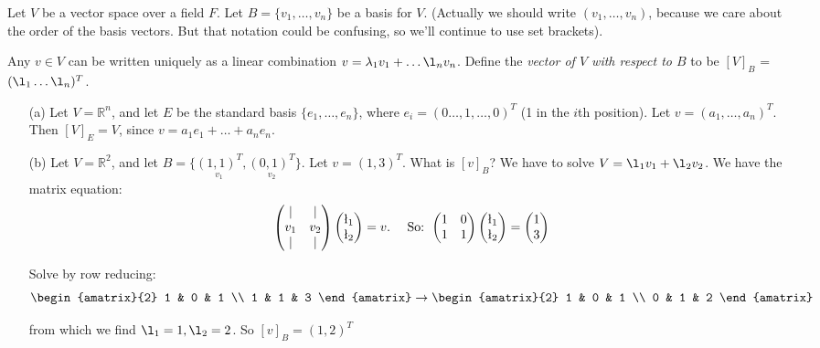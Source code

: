 \documentclass[twoside]{scrartcl}
\begin{document}
\vspace*{5pt}

\begin{definition} 
 Let $V$ be a vector space over a field $F.$ Let $B = \{v_1,\dots,v_n\}$ be a basis for $V$. (Actually we should write $(v_1,\dots,v_n)$, because we care about the order of the basis vectors. But that notation could be confusing, so we'll continue to use set brackets).
 
 Any $v \in V$ can be written uniquely as a linear combination $v = \lambda_1v_1 + \dots \l_nv_n$. Define the \emph{vector of $V$ with respect to $B$} to be $[V]_B$ = $(\l_1 \dots \l_n)^T$.
 \end{definition}\vspace*{10pt}


\begin{examples} \begin{itemize}
 \item[(a)] Let $V = \mathbb{R}^n$, and let $E$ be the standard basis $\{e_1,\dots,e_n\}$, where $e_i = (0\dots,1,\dots,0)^T$ (1 in the $i$th position). Let $v = (a_1, \dots ,a_n)^T.$ Then $[V]_E = V$, since $v = a_1e_1 + \dots + a_ne_n$.
 \item[(b)] Let $V = \mathbb{R}^2$, and let $B = \{\underset{v_1}{(1,1)^T},\underset{v_2}{(0,1)^T}\}$. Let $v = (1,3)^T$. What is $[v]_B$? We have to solve $V = \l_1v_1 + \l_2v_2$. We have the matrix equation:
 \[\begin{pmatrix}
| &  | \\ v_1 & v_2 \\ | & |
\end{pmatrix} 
\begin{pmatrix}
 \l_1 \\ \l_2 \end{pmatrix} = v. \quad \text{ So: }
 \begin{pmatrix}
1 & 0 \\ 1 & 1
\end{pmatrix} 
\begin{pmatrix}
 \l_1 \\ \l_2 \end{pmatrix} = \begin{pmatrix}
 1 \\ 3
 \end{pmatrix}\]


Solve by row reducing:
\[\begin{amatrix}{2}
1 & 0  & 1 \\ 1 & 1 & 3
\end{amatrix}
\rightarrow 
\begin{amatrix}{2}
1 & 0 & 1 \\ 0 & 1 & 2 
\end{amatrix}
\]

from which we find $\l_1 = 1, \l_2 = 2$. So $[v]_B = (1,2)^T$
\end{itemize} 
\end{examples}\vspace*{10pt}
\end{document}
